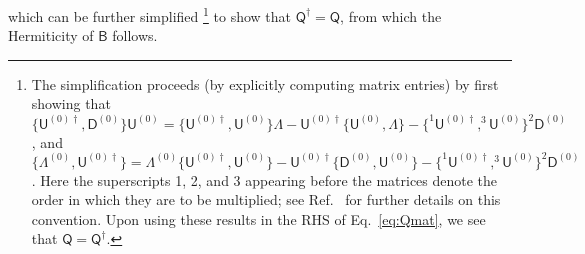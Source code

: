 %
which can be further simplified%
\footnote{The simplification proceeds (by explicitly computing matrix entries) by first showing that
  $\{\mathsf{U}^{(0)\dagger}, \mathsf{D}^{(0)}\}\mathsf{U}^{(0)} = \{\mathsf{U}^{(0)\dagger}, \mathsf{U}^{(0)}\}\Lambda - \mathsf{U}^{(0)\dagger}\{\mathsf{U}^{(0)}, \Lambda\} - \{ ^{1}\mathsf{U}^{(0)\dagger}, ^{3}\mathsf{U}^{(0)}\}^{2}\mathsf{D}^{(0)}$,
  and
  $\{\Lambda^{(0)}, \mathsf{U}^{(0)\dagger}\} = \Lambda^{(0)}\{\mathsf{U}^{(0)\dagger},\mathsf{U}^{(0)}\} - \mathsf{U}^{(0)\dagger}\{\mathsf{D}^{(0)},\mathsf{U}^{(0)}\} - \{^{1}\mathsf{U}^{(0)\dagger},^{3}\mathsf{U}^{(0)}\}^{2}\mathsf{D}^{(0)}$.
  Here the superscripts 1, 2, and 3 appearing before the matrices denote the order in which they are to be multiplied; see Ref.~\cite{littlejohn1991a} for further details on this convention.
  Upon using these results in the RHS of Eq.~\eqref{eq:Qmat}, we see that $\mathsf{Q}=\mathsf{Q}^{\dagger}$.
}
to show that $\mathsf{Q}^{\dagger} = \mathsf{Q}$, from which the Hermiticity of $\mathsf{B}$ follows.

